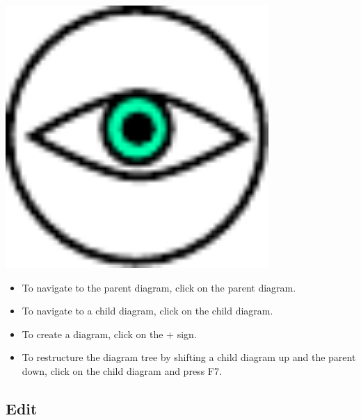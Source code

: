 \includegraphics[width=10cm]{../../gui/source/resources/tool_navigate.pdf}
\begin{itemize}
\item To navigate to the parent diagram, click on the parent diagram.
\item To navigate to a child diagram, click on the child diagram.
\item To create a diagram, click on the + sign.
\item To restructure the diagram tree by shifting a child diagram up and the parent down, click on the child diagram and press F7.
\end{itemize}

\subsection{Edit}


